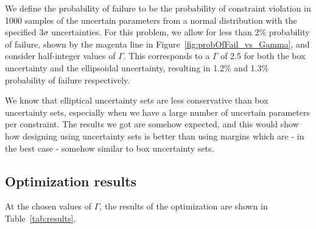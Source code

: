 We define the probability of failure to be the probability of constraint violation in 1000 samples of the uncertain parameters from a normal distribution with the specified $3\sigma$ uncertainties. For this problem, we allow for less than 2\% probability of failure, shown by the magenta line in Figure~\ref{fig:probOfFail_vs_Gamma}, and consider half-integer values of $\Gamma$. This corresponds to a $\Gamma$ of 2.5 for both the box uncertainty and the ellipsoidal uncertainty, resulting in 1.2\% and 1.3\% probability of failure respectively.

We know that elliptical uncertainty sets are less conservative than box uncertainty sets, especially when we have a large number of uncertain parameters per constraint. The results we got are somehow expected, and this would show how designing using uncertainty sets is better than using margins which are - in the best case - somehow similar to box uncertainty sets.

\subsection{Optimization results}

At the chosen values of $\Gamma$, the results of the optimization are shown in Table~\ref{tab:results}.

